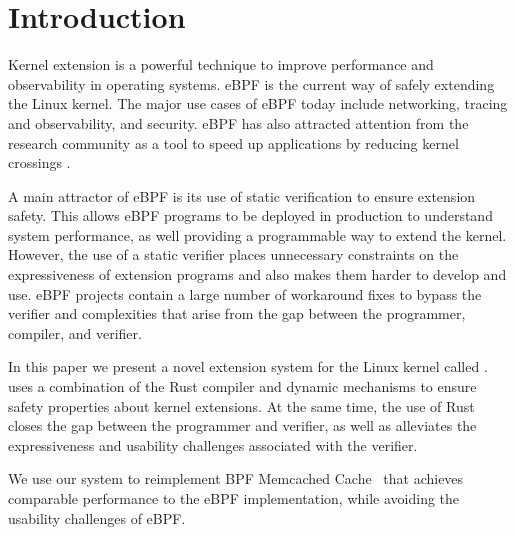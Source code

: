 \section{Introduction}
Kernel extension is a powerful technique to improve performance and
    observability in operating systems.
eBPF is the current way of safely extending the Linux kernel.
The major use cases of eBPF today include networking, tracing and
    observability, and security.
eBPF has also attracted attention from the research community as
    a tool to speed up applications by reducing kernel crossings \cite{BMC,Electrode,bpfxrp}.

A main attractor of eBPF is its use of static verification to ensure extension safety.
This allows eBPF programs to be deployed in production to understand system performance,
    as well providing a programmable way to extend the kernel.
However, the use of a static verifier places unnecessary constraints on the expressiveness
    of extension programs and also makes them harder to develop and use.
eBPF projects contain a large number of workaround fixes to bypass the verifier and
    complexities that arise from the gap between the programmer, compiler, and verifier.

In this paper we present a novel extension system for the Linux kernel called \projname{}.
\projname{} uses a combination of the Rust compiler and dynamic mechanisms
    to ensure safety properties about kernel extensions.
At the same time, the use of Rust closes the gap between the programmer and verifier,
    as well as alleviates the expressiveness and usability challenges associated with
    the verifier.

We use our system to reimplement BPF Memcached Cache~\cite{BMC} that achieves
    comparable performance to the eBPF implementation, while avoiding the
    usability challenges of eBPF.

